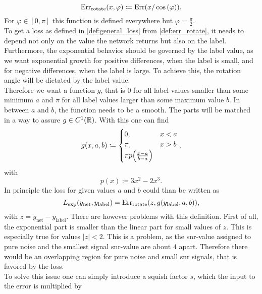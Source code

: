 \begin{equation}\label{def:err_rotate}
\text{Err}_\text{rotate}(x,\varphi)\coloneqq \text{Err}{\left( x/\cos{\left( \varphi \right)} \right)}.
\end{equation}
For $\varphi\in\left[0,\pi\right]$ this function is defined everywhere but $\varphi=\frac{\pi}{2}$.\\
To get a loss as defined in \eqref{def:general_loss} from \eqref{def:err_rotate}, it needs to depend not only on the value the network returns but also on the label. Furthermore, the exponential behavior should be governed by the label value, as we want exponential growth for positive differences, when the label is small, and for negative differences, when the label is large. To achieve this, the rotation angle will be dictated by the label value.\\
Therefore we want a function $g$, that is $0$ for all label values smaller than some minimum $a$ and $\pi$ for all label values larger than some maximum value $b$. In between $a$ and $b$, the function needs to be a smooth. The parts will be matched in a way to assure $g\in C^1(\mathbb{R})$. With this one can find
\begin{equation}
g(x,a,b)\coloneqq
\begin{cases}
0, & x < a\\
\pi, & x>b\\
\pi p{\left( \frac{x-a}{b-a} \right)}
\end{cases},
\end{equation}
with
\begin{equation}
p(x)\coloneqq 3x^2-2x^3.
\end{equation}
In principle the loss for given values $a$ and $b$ could than be written as
\begin{equation}\label{def:loss_original}
L_\text{exp}{\left( y_\text{net}, y_\text{label} \right)}=\text{Err}_\text{rotate}{\left( z, g(y_\text{label},a,b) \right)},
\end{equation}
with $z=y_\text{net}-y_\text{label}$. There are however problems with this definition. First of all, the exponential part is smaller than the linear part for small values of $z$. This is especially true for values $\left| z\right| <2$. This is a problem, as the \gls{snr}-value assigned to pure noise and the smallest signal \gls{snr}-value are about $4$ apart. Therefore there would be an overlapping region for pure noise and small \gls{snr} signals, that is favored by the loss.\\
To solve this issue one can simply introduce a squish factor $s$, which the input to the error is multiplied by
